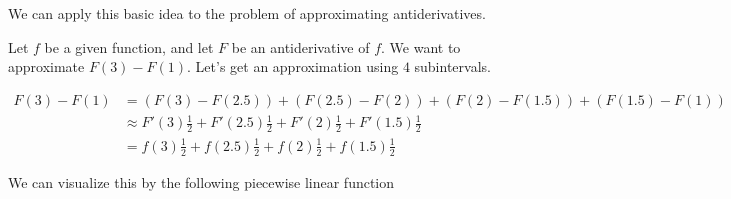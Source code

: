 \documentclass{ximera}
\begin{document}
We can apply this basic idea to the problem of approximating antiderivatives.

\begin{example}
  Let $f$ be a given function, and let $F$ be an antiderivative of $f$.  We want to approximate $F(3) - F(1)$.  Let's get an approximation using $4$ subintervals.
  
  \begin{align*}F(3) - F(1) &= (F(3) - F(2.5))+(F(2.5) - F(2))+(F(2) - F(1.5))+(F(1.5) - F(1))\\
  &\approx F'(3)\frac{1}{2}+F'(2.5)\frac{1}{2}+F'(2)\frac{1}{2}+F'(1.5)\frac{1}{2}\\
  &=f(3)\frac{1}{2}+f(2.5)\frac{1}{2}+f(2)\frac{1}{2}+f(1.5)\frac{1}{2}
  \end{align*}
  
  We can visualize this by the following piecewise linear function
  
\end{example}
\end{document}
